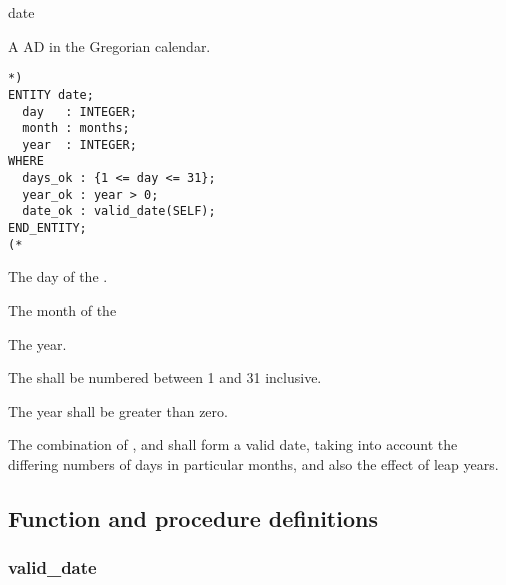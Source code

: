 \documentclass{article}
\begin{document}
\begin{Mnamedesc}{date}
\begin{Mdesctext}
    A  AD in the Gregorian calendar.
\end{Mdesctext}

\begin{Mexp}
\begin{verbatim}
*)
ENTITY date;
  day   : INTEGER;
  month : months;
  year  : INTEGER;
WHERE
  days_ok : {1 <= day <= 31};
  year_ok : year > 0;
  date_ok : valid_date(SELF);
END_ENTITY;
(*
\end{verbatim}
\end{Mexp}

\begin{Matts}

\item[day:] The day of the .

\item[month:] The month of the 

\item[year:] The year.
\end{Matts}

\begin{Mprops}

\item[days\_ok:] The  shall be numbered between 1 and 31 inclusive.

\item[year\_ok:] The year shall be greater than zero.

\item[date\_ok:] The combination of ,  and 
shall form a valid date, taking into account the differing numbers of days in
particular months, and also the effect of leap years.

\end{Mprops}

\end{Mnamedesc}

\subsection{Function and procedure definitions}

\subsubsection{valid\_date}
\end{document}
